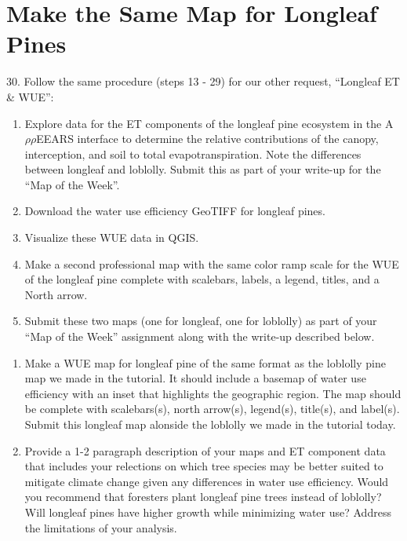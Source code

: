 \documentclass[oneside,a4paper,11pt,explicit]{book}
\begin{document}

\section{Make the Same Map for Longleaf Pines}

30. Follow the same procedure (steps 13 - 29) for our other request, ``Longleaf ET \& WUE'':

\begin{enumerate}
	\item Explore data for the ET components of the longleaf pine ecosystem in the A$\rho\rho$EEARS interface to determine the relative contributions of the canopy, interception, and soil to total evapotranspiration. Note the differences between longleaf and loblolly. Submit this as part of your write-up for the ``Map of the Week''.
	\item Download the water use efficiency GeoTIFF for longleaf pines.
	\item Visualize these WUE data in QGIS.
	\item Make a second professional map with the same color ramp scale for the WUE of the longleaf pine complete with scalebars, labels, a legend, titles, and a North arrow.
	\item Submit these two maps (one for longleaf, one for loblolly) as part of your ``Map of the Week'' assignment along with the write-up described below.
\end{enumerate}

\begin{tcolorbox}[colback=yellow!5!white,colframe=IceCreamOrbit,title= \vspace{.2em} \Large Map of the Week Assignments]
	\large
	\begin{enumerate}
		\item Make a WUE map for longleaf pine of the same format as the loblolly pine map we made in the tutorial. It should include a basemap of water use efficiency with an inset that highlights the geographic region. The map should be complete with scalebars(s), north arrow(s), legend(s), title(s), and label(s). Submit this longleaf map alonside the loblolly we made in the tutorial today.
        \item Provide a 1-2 paragraph description of your maps and ET component data that includes your relections on which tree species may be better suited to mitigate climate change given any differences in water use efficiency. Would you recommend that foresters plant longleaf pine trees instead of loblolly? Will longleaf pines have higher growth while minimizing water use? Address the limitations of your analysis.
	\end{enumerate}
\end{tcolorbox}
\end{document}
